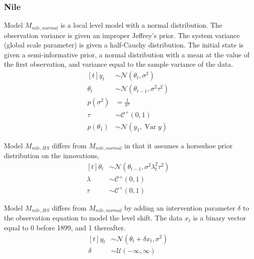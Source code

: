 \documentclass{article}
\newcommand{\dist}[1]{\mathcal{#1}}
\newcommand{\paren}[1]{\ensuremath{\left(#1\right)}}
\newcommand{\dnorm}[1]{\ensuremath{\dist{N}\paren{#1}}}
\newcommand{\dhalfcauchy}[1]{\ensuremath{\dist{C}^{+}\paren{#1}}}
\newcommand{\dunif}[1]{\ensuremath{\dist{U}\paren{#1}}}
\DeclareMathOperator{\Var}{Var}
\begin{document}
\subsubsection{Nile}
\label{sec:nile-1}

Model $M_{nile,normal}$ is a local level model with a normal distribution.
The observation variance is given an improper Jeffrey's prior.
The system variance (global scale parameter) is given a half-Cauchy distribution. 
The initial state is given a semi-informative prior, a normal distribution with a mean at the value of the first observation, and variance equal to the sample variance of the data.
\begin{equation}
  \label{eq:11}
  \begin{aligned}[t]
    y_{t} &\sim \dnorm{\theta_{t}, \sigma^{2}} \\
    \theta_{t} &\sim \dnorm{\theta_{t - 1}, \sigma^{2} \tau^{2}} \\
    p(\sigma^{2}) &= \frac{1}{\sigma^{2}} \\
    \tau &\sim \dhalfcauchy{0, 1} \\
    p(\theta_{1}) &\sim \dnorm{y_{1}, \Var{y}}
  \end{aligned}
\end{equation}

Model $M_{nile,HS}$ differs from $M_{nile,normal}$ in that it assumes a horseshoe prior distribution on 
the innovations,
\begin{equation}
  \label{eq:18}
  \begin{aligned}[t]
    \theta_{t} &\sim \dnorm{\theta_{t - 1}, \sigma^{2} \lambda_{t}^{2} \tau^{2}} \\
    \lambda &\sim \dhalfcauchy{0, 1} \\
    \tau &\sim \dhalfcauchy{0, 1}
  \end{aligned}
\end{equation}

Model $M_{nile,HS}$ differs from $M_{nile,normal}$ by adding an intervention parameter $\delta$ to the observation equation to model the level shift. 
The data $x_{t}$ is a binary vector equal to 0 before 1899, and 1 thereafter.
\begin{equation}
  \label{eq:19}
  \begin{aligned}[t]
    y_{t} &\sim \dnorm{\theta_{t} + \delta x_{t}, \sigma^{2}} \\
    \delta &\sim \dunif{-\infty, \infty}
  \end{aligned}
\end{equation}

\clearpage{}

\printbibliography{}
\end{document}
